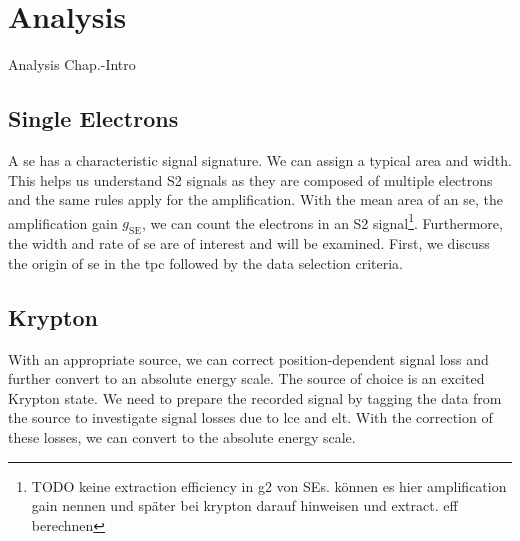\FloatBarrier
\chapter{Analysis}
\label{chap:Analysis}
\FloatBarrier

Analysis Chap.-Intro

\FloatBarrier
\section{Single Electrons}
\label{sec:SE}
\FloatBarrier

A \gls{se} has a characteristic signal signature.
We can assign a typical area and width.
This helps us understand S2 signals as they are composed of multiple electrons and the same rules apply for the amplification.
With the mean area of an \gls{se}, the amplification gain $ g_\mathrm{SE} $, we can count the electrons in an S2 signal\footnote{TODO keine extraction efficiency in g2 von SEs. können es hier amplification gain nennen und später bei krypton darauf hinweisen und extract. eff berechnen}.
Furthermore, the width and rate of \gls{se} are of interest and will be examined.
First, we discuss the origin of \gls{se} in the \gls{tpc} followed by the data selection criteria.



\newpage

\newpage

\newpage

\newpage

\newpage

\FloatBarrier
\section{Krypton}
\label{sec:Kr}
\FloatBarrier

With an appropriate source, we can correct position-dependent signal loss and further convert to an absolute energy scale.
The source of choice is an excited Krypton state.
We need to prepare the recorded signal by tagging the data from the source to investigate signal losses due to \gls{lce} and \gls{elt}.
With the correction of these losses, we can convert to the absolute energy scale.



\newpage

\newpage

\newpage

\newpage

\newpage

\newpage

\newpage

\newpage
\FloatBarrier

